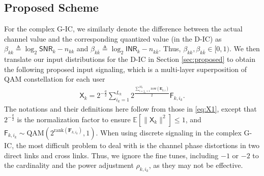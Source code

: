 \documentclass[12pt, draftclsnofoot, onecolumn]{IEEEtran}
\newcommand{\msf}[1]{\mathsf{#1}}
\newcommand{\SNR}{\msf{SNR}}
\newcommand{\INR}{\msf{INR}}
\theoremstyle{definition}
\begin{document}
\subsection{Proposed Scheme}
For the complex G-IC, we similarly denote the difference between the actual channel value and the corresponding quantized value (in the D-IC) as $\beta_{kk} \triangleq \log_2\SNR_k-n_{kk}$ and $\beta_{k\bar{k}} \triangleq \log_2\INR_{k}-n_{k\bar{k}}$. Thus, $\beta_{kk},\beta_{k\bar{k}} \in [0,1)$. We then translate our input distributions for the D-IC in Section \ref{sec:proposed} to obtain the following proposed input signaling, which is a multi-layer superposition of QAM constellation for each user
\begin{align}\label{eq:X1X2_complex}
\msf{X}_k = 2^{-\frac{q}{2}}\sum_{i_k=1}^{L_k}2^{\frac{\sum_{i=j_k+1}^{M_k}\text{row}(\boldsymbol{E}_{k,i})}{2}}\msf{F}_{k,i_k}.
\end{align}
The notations and their definitions here follow from those in \eqref{eq:X1}, except that $2^{-\frac{q}{2}}$ is the normalization factor to ensure $\mathbb{E}[\|\msf{X}_k\|^2] \leq 1$, and $\msf{F}_{k,i_k} \sim \text{QAM}(2^{\text{rank}(\boldsymbol{F}_{k,i_k})},1)$. When using discrete signaling in the complex G-IC, the most difficult problem to deal with is the channel phase distortions in two direct links and cross links. Thus, we ignore the fine tunes, including $-1$ or $-2$ to the cardinality and the power adjustment $\rho_{k,i_k}$, as they may not be effective.
\end{document}
